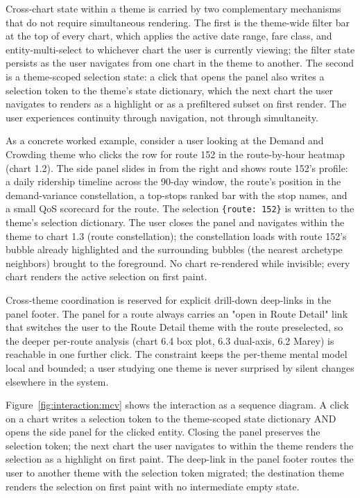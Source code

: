 Cross-chart state within a theme is carried by two complementary
mechanisms that do not require simultaneous rendering. The first is
the theme-wide filter bar at the top of every chart, which applies
the active date range, fare class, and entity-multi-select to whichever
chart the user is currently viewing; the filter state persists as the
user navigates from one chart in the theme to another. The second is
a theme-scoped selection state: a click that opens the panel also
writes a selection token to the theme's state dictionary, which the
next chart the user navigates to renders as a highlight or as a
prefiltered subset on first render. The user experiences continuity
through navigation, not through simultaneity.

As a concrete worked example, consider a user looking at the Demand
and Crowding theme who clicks the row for route 152 in the
route-by-hour heatmap (chart 1.2). The side panel slides in from the
right and shows route 152's profile: a daily ridership timeline across
the 90-day window, the route's position in the demand-variance
constellation, a top-stops ranked bar with the stop names, and a small
QoS scorecard for the route. The selection \texttt{\{route: 152\}} is
written to the theme's selection dictionary. The user closes the
panel and navigates within the theme to chart 1.3 (route constellation);
the constellation loads with route 152's bubble already highlighted
and the surrounding bubbles (the nearest archetype neighbors) brought
to the foreground. No chart re-rendered while invisible; every chart
renders the active selection on first paint.

Cross-theme coordination is reserved for explicit drill-down deep-links
in the panel footer. The panel for a route always carries an "open in
Route Detail" link that switches the user to the Route Detail theme
with the route preselected, so the deeper per-route analysis (chart
6.4 box plot, 6.3 dual-axis, 6.2 Marey) is reachable in one further
click. The constraint keeps the per-theme mental model local and
bounded; a user studying one theme is never surprised by silent
changes elsewhere in the system.

Figure~\ref{fig:interaction:mcv} shows the interaction as a sequence
diagram. A click on a chart writes a selection token to the
theme-scoped state dictionary AND opens the side panel for the clicked
entity. Closing the panel preserves the selection token; the next
chart the user navigates to within the theme renders the selection as
a highlight on first paint. The deep-link in the panel footer routes
the user to another theme with the selection token migrated; the
destination theme renders the selection on first paint with no
intermediate empty state.

